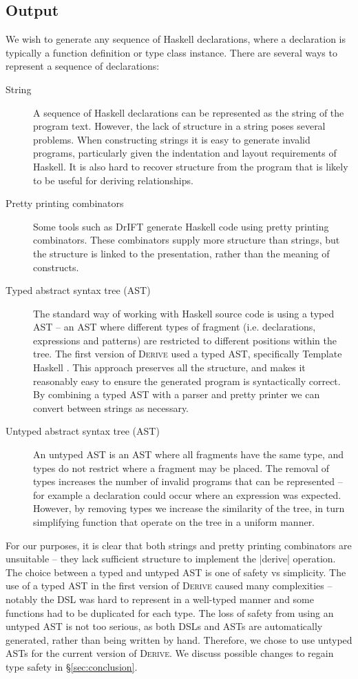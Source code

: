 \documentclass{llncs}
\newcommand{\derive}{\textsc{Derive}}
\begin{document}
\subsection{Output}
\label{sec:output}

We wish to generate any sequence of Haskell declarations, where a declaration is typically a function definition or type class instance. There are several ways to represent a sequence of declarations:

\begin{description}
\item[String] A sequence of Haskell declarations can be represented as the string of the program text. However, the lack of structure in a string poses several problems. When constructing strings it is easy to generate invalid programs, particularly given the indentation and layout requirements of Haskell. It is also hard to recover structure from the program that is likely to be useful for deriving relationships.
\item[Pretty printing combinators] Some tools such as DrIFT \cite{drift} generate Haskell code using pretty printing combinators. These combinators supply more structure than strings, but the structure is linked to the presentation, rather than the meaning of constructs.
\item[Typed abstract syntax tree (AST)] The standard way of working with Haskell source code is using a typed AST -- an AST where different types of fragment (i.e. declarations, expressions and patterns) are restricted to different positions within the tree. The first version of \derive{} used a typed AST, specifically Template Haskell \cite{template_haskell}. This approach preserves all the structure, and makes it reasonably easy to ensure the generated program is syntactically correct. By combining a typed AST with a parser and pretty printer we can convert between strings as necessary.
\item[Untyped abstract syntax tree (AST)] An untyped AST is an AST where all fragments have the same type, and types do not restrict where a fragment may be placed. The removal of types increases the number of invalid programs that can be represented -- for example a declaration could occur where an expression was expected. However, by removing types we increase the similarity of the tree, in turn simplifying function that operate on the tree in a uniform manner.
\end{description}

For our purposes, it is clear that both strings and pretty printing combinators are unsuitable -- they lack sufficient structure to implement the |derive| operation. The choice between a typed and untyped AST is one of safety vs simplicity. The use of a typed AST in the first version of \derive{} caused many complexities -- notably the DSL was hard to represent in a well-typed manner and some functions had to be duplicated for each type. The loss of safety from using an untyped AST is not too serious, as both DSLs and ASTs are automatically generated, rather than being written by hand. Therefore, we chose to use untyped ASTs for the current version of \derive{}. We discuss possible changes to regain type safety in \S\ref{sec:conclusion}.
\end{document}
